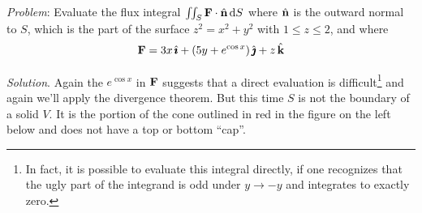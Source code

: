 \begin{eg}\label{eg:divThmB}
\noindent\textit{Problem}:
Evaluate the flux integral $\iint_S \mathbf{F}\cdot\hat{\mathbf{n}}\,\mathrm{d}S$ where
$\hat{\mathbf{n}} $ is the outward normal to $S$, which is the part of the surface
$z^2=x^2+y^2$ with $1\le z\le 2$, and where
\begin{equation*}
\mathbf{F} = 3x\,\hat{\pmb{\imath}} + (5y+e^{\cos x})\,\hat{\pmb{\jmath}} + z\,\hat{\mathbf{k}}
\end{equation*}

\medskip
\noindent\textit{Solution}. 
Again the $e^{\cos x}$ in $\mathbf{F}$ suggests that a direct evaluation 
is difficult\footnote{In fact, it is possible to evaluate this integral directly, if one recognizes that the ugly part of the integrand 
is odd under $y\rightarrow-y$ and integrates to exactly zero. } 
and again we'll apply the divergence theorem. But this time
$S$ is not the boundary of a solid $V$. It is the portion of the cone outlined
in red in the figure on the left below and does not have a top or 
bottom ``cap''.
\end{eg}

